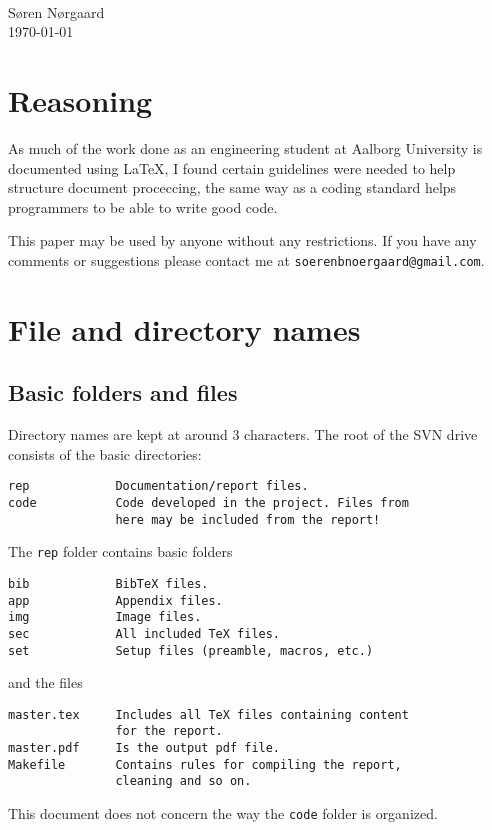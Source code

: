 

{  %
    \flushleft
    \Large {}\\
    \large \sffamily Søren Nørgaard\\
    \today\\
}\vspace{2em}


\section*{Reasoning}
\label{sec:reasoning}
As much of the work done as an engineering student at Aalborg University is documented using \LaTeX, I found certain guidelines were needed to help structure document proceccing, the same way as a coding standard helps programmers to be able to write good code.


This paper may be used by anyone without any restrictions. If you have any comments or suggestions please contact me at \texttt{soerenbnoergaard@gmail.com}.


\tableofcontents
\clearpage


\section{File and directory names}
\label{sec:files}


\subsection{Basic folders and files}
Directory names are kept at around 3 characters. The root of the SVN drive consists of the basic directories:
\begin{verbatim}
rep            Documentation/report files.
code           Code developed in the project. Files from 
               here may be included from the report!
\end{verbatim} 
The \texttt{rep} folder contains basic folders
\begin{verbatim}
bib            BibTeX files.
app            Appendix files.
img            Image files.
sec            All included TeX files.
set            Setup files (preamble, macros, etc.)
\end{verbatim}
and the files
\begin{verbatim}
master.tex     Includes all TeX files containing content 
               for the report.
master.pdf     Is the output pdf file.
Makefile       Contains rules for compiling the report, 
               cleaning and so on.
\end{verbatim}
This document does not concern the way the \texttt{code} folder is organized.


